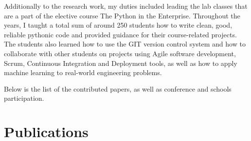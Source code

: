 Additionally to the research work, my duties included leading the lab classes that are a part of the elective course The Python in the Enterprise. Throughout the years, I taught a total sum of around 250 students how to write clean, good, reliable pythonic code and provided guidance for their course-related projects. The students also learned how to use the GIT version control system and how to collaborate with other students on projects using Agile software development, Scrum, Continuous Integration and Deployment tools, as well as how to apply machine learning to real-world engineering problems.

Below is the list of the contributed papers, as well as conference and schools participation.


\section*{Publications}
